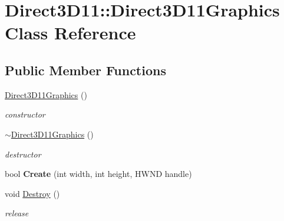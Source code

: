 \hypertarget{class_direct3_d11_1_1_direct3_d11_graphics}{}\section{Direct3\+D11\+:\+:Direct3\+D11\+Graphics Class Reference}
\label{class_direct3_d11_1_1_direct3_d11_graphics}
\subsection*{Public Member Functions}
\begin{DoxyCompactItemize}
\item 
\mbox{\label{class_direct3_d11_1_1_direct3_d11_graphics_a8e384f568bdbd71b62c814cae93e42a0}} 
\mbox{\hyperlink{class_direct3_d11_1_1_direct3_d11_graphics_a8e384f568bdbd71b62c814cae93e42a0}{Direct3\+D11\+Graphics}} ()
\begin{DoxyCompactList}\small\item\em constructor \end{DoxyCompactList}\item 
\mbox{\label{class_direct3_d11_1_1_direct3_d11_graphics_a487a06a57fdc9d2951d5c197fc94ab21}} 
\mbox{\hyperlink{class_direct3_d11_1_1_direct3_d11_graphics_a487a06a57fdc9d2951d5c197fc94ab21}{$\sim$\+Direct3\+D11\+Graphics}} ()
\begin{DoxyCompactList}\small\item\em destructor \end{DoxyCompactList}\item 
\mbox{\label{class_direct3_d11_1_1_direct3_d11_graphics_ad088d2d23e1efe49e20d0509d7884080}} 
bool {\bfseries Create} (int width, int height, H\+W\+ND handle)
\item 
\mbox{\label{class_direct3_d11_1_1_direct3_d11_graphics_af45263dbbd1a8f7b3aa27ea329f941d3}} 
void \mbox{\hyperlink{class_direct3_d11_1_1_direct3_d11_graphics_af45263dbbd1a8f7b3aa27ea329f941d3}{Destroy}} ()
\begin{DoxyCompactList}\small\item\em release \end{DoxyCompactList}\item 

\end{DoxyCompactItemize}
